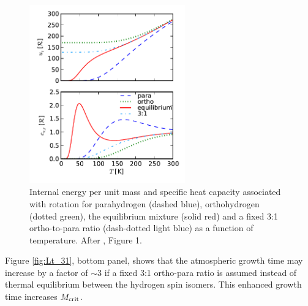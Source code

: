 \begin{figure}[H]
\centering
\includegraphics[width=0.6\textwidth]{figures/ortho_para_energy.pdf}
\caption{Internal energy per unit mass and specific heat capacity associated with rotation for parahydrogen (dashed blue), orthohydrogen (dotted green), the equilibrium mixture (solid red) and a fixed 3:1 ortho-to-para ratio (dash-dotted light blue) as a function of temperature. After \citet{farkas35}, Figure 1.}
\label{fig:ucvr}
\end{figure}

Figure \ref{fig:Lt_31}, bottom panel, shows that the atmospheric growth time may increase by a factor of $\sim$$3$ if a fixed 3:1 ortho-para ratio is assumed instead of thermal equilibrium between the hydrogen spin isomers.  This enhanced growth time  increases $M_{\rm crit}$. 





